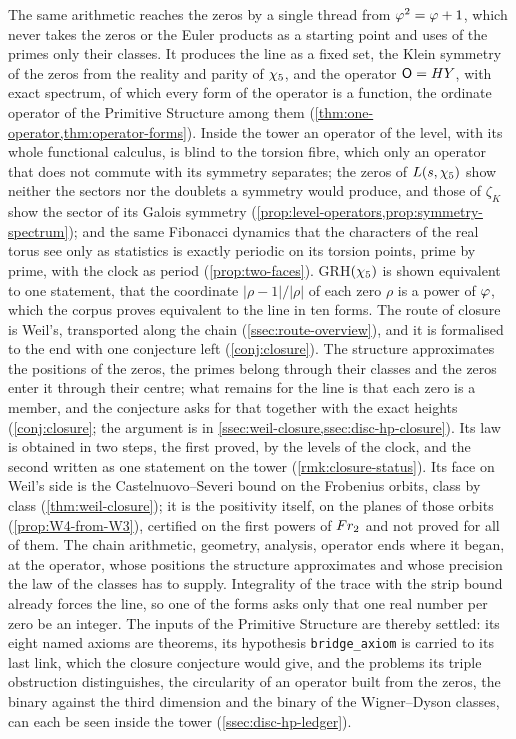 The same arithmetic reaches the zeros by a single thread from $\varphi^2=\varphi+1$,
which never takes the zeros or the Euler products as a starting point and uses of the
primes only their classes.  It produces the line as a fixed set, the Klein symmetry of
the zeros from the reality and parity of $\chi_5$, and the operator $\mathsf{O}=HY$, with exact spectrum,
of which every form of the operator is a function, the ordinate operator of the Primitive Structure among
them (\cref{thm:one-operator,thm:operator-forms}).  Inside the tower an operator of the level, with its whole functional calculus, is blind to the
torsion fibre, which only an operator that does not commute with its symmetry separates; the zeros of $L(s,\chi_5)$ show
neither the sectors nor the doublets a symmetry would produce, and those of $\zeta_K$ show the sector of its Galois
symmetry (\cref{prop:level-operators,prop:symmetry-spectrum}); and the same Fibonacci dynamics that the characters of the
real torus see only as statistics is exactly periodic on its torsion points, prime by prime, with the clock as
period (\cref{prop:two-faces}).  GRH$(\chi_5)$ is shown equivalent to one statement, that the coordinate $|\rho-1|/|\rho|$ of each zero $\rho$ is a power of $\varphi$, which the corpus
proves equivalent to the line in ten forms.  The route of closure is Weil's, transported along the chain (\cref{ssec:route-overview}), and it is
formalised to the end with one conjecture left (\cref{conj:closure}).  The structure approximates the positions of the zeros, the primes belong through their classes and the zeros enter it through their centre; what remains for the line is that each zero is a member, and the conjecture asks for that together with the exact heights (\cref{conj:closure}; the argument is in \cref{ssec:weil-closure,ssec:disc-hp-closure}).  Its law is obtained in two steps, the first proved, by the levels of the clock, and the second
written as one statement on the tower (\cref{rmk:closure-status}).  Its face on Weil's side is the Castelnuovo--Severi bound on
the Frobenius orbits, class by class (\cref{thm:weil-closure}); it is the positivity itself, on the planes of those orbits (\cref{prop:W4-from-W3}), certified on the first powers of $Fr_2$ and not proved for all of them.  The chain
arithmetic, geometry, analysis, operator ends where it began, at the operator, whose positions the structure approximates and whose precision the law of the classes has to supply.
Integrality of the trace with the strip bound already forces the line, so one of the forms
asks only that one real number per zero be an integer.  The inputs of the Primitive Structure are thereby settled: its eight named axioms
are theorems, its hypothesis \texttt{bridge\_axiom} is carried to its last link, which the closure conjecture would give,
and the problems its triple obstruction distinguishes, the circularity of an operator built from the zeros, the
binary against the third dimension and the binary of the Wigner--Dyson classes, can each be seen inside the tower
(\cref{ssec:disc-hp-ledger}).

